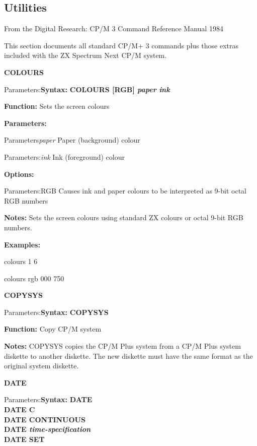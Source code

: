 \subsection{Utilities}

From the Digital Research: CP/M 3 Command Reference Manual 1984

This section documents all standard CP/M+ 3 commands plus those extras
included with the ZX Spectrum Next CP/M system.

{\Large\textbf{COLOURS}}

\begin{labeledpar}{Parameters:}{\textbf{Syntax:}}
\textbf{COLOURS [RGB] \textit{paper} \textit{ink}}
\end{labeledpar}

\textbf{Function:} Sets the screen colours

\textbf{Parameters:}
\begin{labeledpar}{Parameters}{\textit{paper}}
  Paper (background) colour
\end{labeledpar}
\begin{labeledpar}{Parameters:}{\textit{ink}}
  Ink (foreground) colour
\end{labeledpar}

\textbf{Options:}
\begin{labeledpar}{Parameters:}{RGB}
  Causes ink and paper colours to be interpreted as 9-bit octal RGB numbers
\end{labeledpar}

\textbf{Notes:} Sets the screen colours using standard ZX colours
or octal 9-bit RGB numbers.

\textbf{Examples:}

colours 1 6

colours rgb 000 750

{\Large\textbf{COPYSYS}}

\begin{labeledpar}{Parameters:}{\textbf{Syntax:}}
\textbf{COPYSYS}
\end{labeledpar}

\textbf{Function:} Copy CP/M system

\textbf{Notes:} COPYSYS copies the CP/M Plus system from a CP/M Plus
system diskette to another diskette.  The new diskette must have the
same format as the original system diskette.

{\Large\textbf{DATE}}

\begin{labeledpar}{Parameters:}{\textbf{Syntax:}}
\textbf{DATE}\\
\textbf{DATE C}\\
\textbf{DATE CONTINUOUS}\\
\textbf{DATE \textit{time-specification}}\\
\textbf{DATE SET}
\end{labeledpar}

